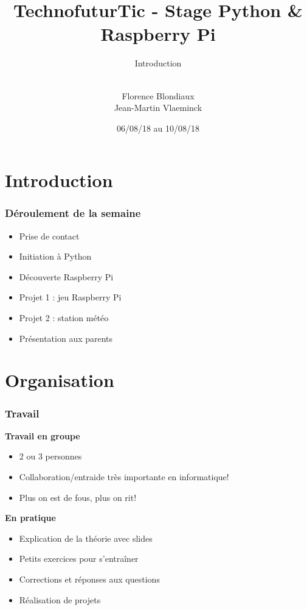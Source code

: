\documentclass[xcolor=table]{beamer}
\title[Stage Python]{TechnofuturTic - Stage Python \& Raspberry Pi} %
\subtitle{Introduction}
\author[] {\\Florence Blondiaux \\ Jean-Martin Vlaeminck} %
\institute[] %
{
Université Catholique de Louvain \\ %
\medskip

}
\date{06/08/18 au 10/08/18}
\begin{document}
\begin{frame}
\titlepage %
\end{frame}





\section{Introduction}

\begin{frame}
\frametitle{Déroulement de la semaine}
    \begin{itemize}
        \item Prise de contact
        \item Initiation à Python
        \item Découverte Raspberry Pi
        \item Projet 1 : jeu Raspberry Pi
        \item Projet 2 : station météo %
        \item Présentation aux parents
    \end{itemize}
\end{frame}

\section{Organisation}

\begin{frame}
\frametitle{Travail}
    \textbf{Travail en groupe}
    \begin{itemize}
        \item 2 ou 3 personnes
        \item Collaboration/entraide très importante en informatique!
        \item Plus on est de fous, plus on rit!
    \end{itemize}
    
    \textbf{En pratique}
    \begin{itemize}
        \item Explication de la théorie avec slides
        \item Petits exercices pour s'entraîner
        \item Corrections et réponses aux questions
        \item Réalisation de projets
    \end{itemize}
\end{frame}
\end{document}
